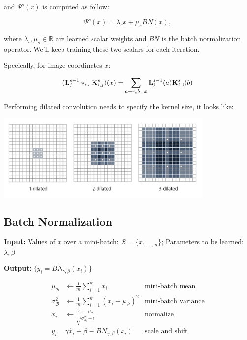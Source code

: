 \documentclass{article}
\newcommand{\tb}{\textbf}
\begin{document}
and $\Psi^s(x)$ is computed as follow:

$$\Psi^s(x) = \lambda_s x + \mu_s BN(x),$$

where $\lambda_s, \mu_s \in \mathbb R$ are learned scalar weights and $BN$ is the batch normalization operator. We'll keep training these two scalars for each iteration.

Specically, for image coordinates $x$:

$$(\textbf L_j^{s - 1} *_{r_s} \textbf K_{i,j}^s) (x) = \sum\limits_{a + r_s b = x} \textbf L_j^{s - 1}(a) \textbf K_{i,j}^s(b)$$

Performing dilated convolution needs to specify the kernel size, it looks like: \\

\begin{center}
\includegraphics[width=0.8\textwidth]{img/dilated.png}
\end{center}

\subsection*{Batch Normalization}

\tb{Input:} Values of $x$ over a mini-batch: $\mathcal B = \{x_{1, \dots, m}\}$; Parameters to be learned: $\lambda, \beta$

\tb{Output:} $\{y_i = BN_{\gamma, \beta}(x_i)\}$

\begin{align*}
\mu_{\mathcal B}      & \leftarrow \frac{1}{m} \sum_{i = 1}^m x_i                                         & \text{mini-batch mean} \\
\sigma_{\mathcal B}^2 & \leftarrow \frac{1}{m} \sum_{i = 1}^m (x_i - \mu_{\mathcal B})^2                  & \text{mini-batch variance} \\
\hat x_i              & \leftarrow \frac{x_i - \mu_{\mathcal B}}{\sqrt{\sigma_{\mathcal B}^2 + \epsilon}} & \text{normalize} \\
y_i                   & \gamma \hat x_i + \beta \equiv BN_{\gamma, \beta}(x_i)                            & \text{scale and shift}
\end{align*}
\end{document}
